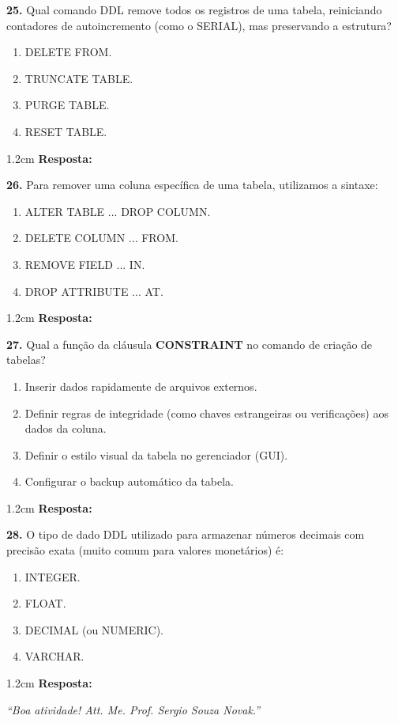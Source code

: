 \documentclass[12pt]{article}
\begin{document}
\textbf{25.} Qual comando DDL remove todos os registros de uma tabela, reiniciando contadores de autoincremento (como o SERIAL), mas preservando a estrutura?
\begin{enumerate}[label=\Alph*)]
  \item DELETE FROM.
  \item TRUNCATE TABLE.
  \item PURGE TABLE.
  \item RESET TABLE.
\end{enumerate}
\begin{resposta}{1.2cm} \textbf{Resposta:} \end{resposta}

\vspace{0.3cm}

\textbf{26.} Para remover uma coluna específica de uma tabela, utilizamos a sintaxe:
\begin{enumerate}[label=\Alph*)]
  \item ALTER TABLE ... DROP COLUMN.
  \item DELETE COLUMN ... FROM.
  \item REMOVE FIELD ... IN.
  \item DROP ATTRIBUTE ... AT.
\end{enumerate}
\begin{resposta}{1.2cm} \textbf{Resposta:} \end{resposta}

\vspace{0.3cm}

\textbf{27.} Qual a função da cláusula \textbf{CONSTRAINT} no comando de criação de tabelas?
\begin{enumerate}[label=\Alph*)]
  \item Inserir dados rapidamente de arquivos externos.
  \item Definir regras de integridade (como chaves estrangeiras ou verificações) aos dados da coluna.
  \item Definir o estilo visual da tabela no gerenciador (GUI).
  \item Configurar o backup automático da tabela.
\end{enumerate}
\begin{resposta}{1.2cm} \textbf{Resposta:} \end{resposta}

\vspace{0.3cm}

\textbf{28.} O tipo de dado DDL utilizado para armazenar números decimais com precisão exata (muito comum para valores monetários) é:
\begin{enumerate}[label=\Alph*)]
  \item INTEGER.
  \item FLOAT.
  \item DECIMAL (ou NUMERIC).
  \item VARCHAR.
\end{enumerate}
\begin{resposta}{1.2cm} \textbf{Resposta:} \end{resposta}

\vspace{0.8cm}

\begin{center}
  \textit{``Boa atividade! Att. Me. Prof. Sergio Souza Novak.''}
\end{center}

\end{document}
